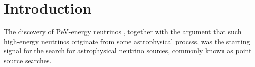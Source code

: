 \chapter{Introduction}
%
%

The discovery of $\si{\peta\electronvolt}$-energy neutrinos \cite{pev_neutrino}, together with the argument that such high-energy neutrinos originate from some astrophysical process, was the starting signal for the search for astrophysical neutrino sources, commonly known as point source searches.

